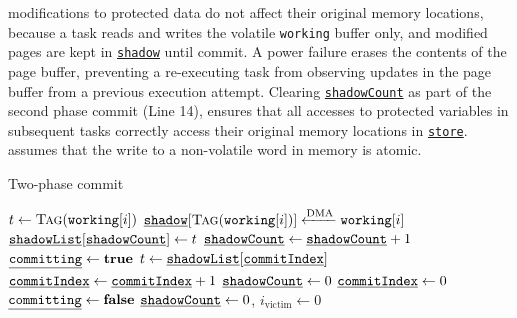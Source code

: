 modifications to protected data do not affect their original memory locations,
because a task reads and writes the volatile \texttt{working} buffer only, and
modified pages are kept in \texttt{\underline{shadow}} until commit.  A power
failure erases the contents of the page buffer, preventing a re-executing task
from observing updates in the page buffer from a previous execution attempt.
Clearing \texttt{\underline{shadowCount}} as part of the second phase commit
(Line 14), ensures that all accesses to protected variables in subsequent tasks
correctly access their original memory locations in \texttt{\underline{store}}.
\sys assumes that the write to a non-volatile word in memory is atomic. \\
%
\begin{algorithm}[t]
	\caption{Two-phase commit}
	\label{algo:commit}
	\scriptsize
	\begin{algorithmic}[1]
         
                \State $t \gets \Call{Tag}{\texttt{working}[i]}$
                \State $\texttt{\underline{shadow}}[\Call{Tag}{\texttt{working}[i]}] \xleftarrow{\text{DMA}} \texttt{working}[i]$
                \State $\texttt{\underline{shadowList}}[\texttt{\underline{shadowCount}}] \gets t$
                \State $\texttt{\underline{shadowCount}} \gets \texttt{\underline{shadowCount}} + 1$
            \EndFor
            \State {}
        \EndProcedure
         
            \State $\texttt{\underline{committing}} \gets \textbf{true}$
                \State $t \gets \texttt{\underline{shadowList}}[\texttt{\underline{commitIndex}}]$
                \State {}
                \State $\texttt{\underline{commitIndex}} \gets \texttt{\underline{commitIndex}} + 1$
            \EndWhile
            \State $\texttt{\underline{shadowCount}} \gets 0$
            \State $\texttt{\underline{commitIndex}} \gets 0$
            \State $\texttt{\underline{committing}} \gets \textbf{false}$
        \EndProcedure
         
             
            \EndIf
            \State $\texttt{\underline{shadowCount}} \gets 0$, $i_\text{victim} \gets 0$
        \EndProcedure
	\end{algorithmic}
\end{algorithm}
%
